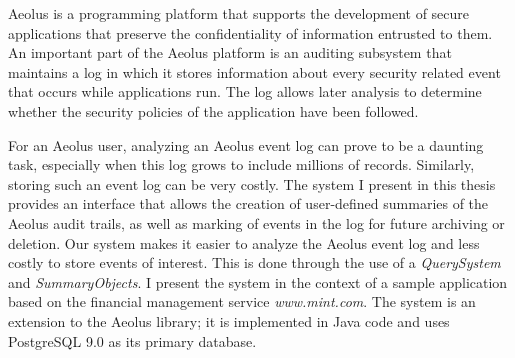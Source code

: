% 
% 
%
Aeolus is a programming platform that supports the development of secure applications that preserve the confidentiality of information entrusted to them. An important part of the Aeolus platform is an auditing subsystem that maintains a log in which it stores information about every security related event that occurs while applications run. The log allows later analysis to determine whether the security policies of the application have been followed.

For an Aeolus user, analyzing an Aeolus event log can prove to be a daunting task, especially when this log grows to include millions of records. Similarly, storing such an event log can be very costly. The system I present in this thesis provides an interface that allows the creation of user-defined summaries of the Aeolus audit trails, as well as marking of events in the log for future archiving or deletion. Our system makes it easier to analyze the Aeolus event log and less costly to store events of interest. This is done through the use of a \emph{QuerySystem} and \emph{SummaryObjects}.
I present the system in the context of a sample application based on the financial management service \emph{www.mint.com}. The system is an extension to the Aeolus library; it is implemented in Java code and uses PostgreSQL 9.0 as its primary database.




